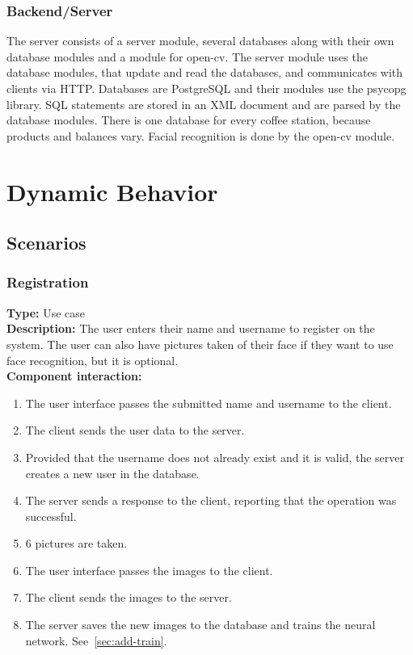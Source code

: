 \documentclass[11pt]{article}
\begin{document}
\subsubsection*{Backend/Server}
The server consists of a server module, several databases along with their own database modules and a module for open-cv. 
The server module uses the database modules, that update and read the databases, and communicates with clients via HTTP.
Databases are PostgreSQL and their modules use the psycopg library. SQL statements are stored in an XML document and are
parsed by the database modules. There is one database for every coffee station, because
products and balances vary. Facial recognition is done by the open-cv module. 

\section{Dynamic Behavior}
\subsection{Scenarios}

\subsubsection{Registration}
\textbf{Type:} Use case\\
\textbf{Description:} The user enters their name and username to register on the system.
The user can also have pictures taken of their face if they want to use face recognition,
but it is optional.\\
\textbf{Component interaction:} 
\begin{enumerate} 
\item{The user interface passes the submitted name and username to the client.}
\item{The client sends the user data to the server.}
\item{Provided that the username does not already exist and it is valid, the server creates a new user in the database.}
\item{The server sends a response to the client, reporting that the operation was successful.}
\item{6 pictures are taken.}
\item{The user interface passes the images to the client.}
\item{The client sends the images to the server.}
\item{The server saves the new images to the database and trains the neural network. See~\ref{sec:add-train}.}
\end{enumerate}
\end{document}
